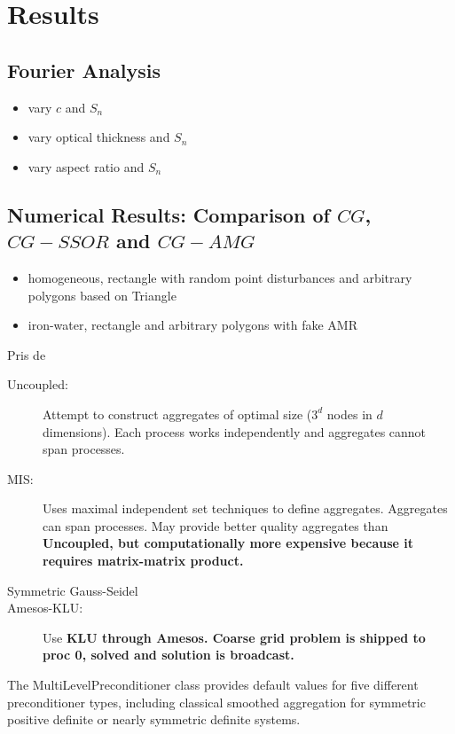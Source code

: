 \section{Results} \label{sec_res}
\subsection{Fourier Analysis}
\begin{itemize}
\item vary $c$ and $S_n$
\item vary optical thickness and $S_n$
\item vary aspect ratio and $S_n$
\end{itemize}
\subsection{Numerical Results: Comparison of $CG$, $CG-SSOR$ and $CG-AMG$}
\begin{itemize}
\item homogeneous, rectangle with random point disturbances and arbitrary
polygons based on Triangle
\item iron-water, rectangle and arbitrary polygons with fake AMR
\end{itemize}
Pris de \cite{ml_guide}\\
\begin{description}
\item [Uncoupled:] Attempt to construct aggregates of optimal size ($3^d$
nodes in $d$ dimensions). Each process works independently and aggregates
cannot span processes.
\item [MIS:] Uses maximal independent set techniques \cite{mis} to define
aggregates. Aggregates can span processes. May provide better quality
aggregates than \bf{Uncoupled}, but computationally more expensive because it
requires matrix-matrix product.
\item[Symmetric Gauss-Seidel]
\item[Amesos-KLU:] Use \bf{KLU} through \bf{Amesos}. Coarse grid problem is
shipped to proc 0, solved and solution is broadcast.
\end{description}
The MultiLevelPreconditioner class provides default values for five different
preconditioner types, including classical smoothed aggregation for symmetric
positive definite or nearly symmetric definite systems.
